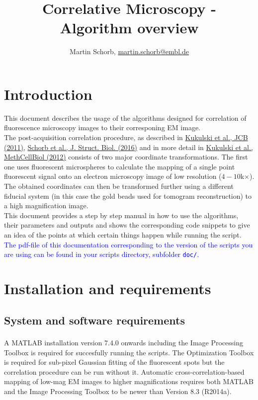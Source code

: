 \documentclass[10pt,a4paper,onepage,DIV12]{scrartcl}
\title{Correlative Microscopy - Algorithm overview}
\author{Martin Schorb, \href{mailto:martin.schorb@embl.de}{martin.schorb@embl.de}}
\begin{document}
\maketitle
\tableofcontents
 \newpage
\section{Introduction}
This document describes the usage of the algorithms designed for correlation of fluorescence microscopy images to their corresponing EM image.\\

The post-acquisition correlation procedure, as described in \href{http://dx.doi.org/10.1083/jcb.201009037}{Kukulski et al., JCB (2011)}, \href{}{Schorb et al., J. Struct. Biol. (2016)} and in more detail in \href{http://dx.doi.org/10.1016/B978-0-12-416026-2.00013-3}{Kukulski et al., MethCellBiol (2012)} consists of two major coordinate transformations. The first one uses fluorescent microspheres to calculate the mapping of a single point fluorescent signal onto an electron microscopy image of low resolution ($4-10 $k$\times$). The obtained coordinates can then be transformed further using a different fiducial system (in this case the gold beads used for tomogram reconstruction) to a high magnification image.\\

This document provides a step by step manual in how to use the algorithms, their parameters and outputs and shows the corresponding code snippets to give an idea of the points at which certain things happen while running the script.\\

\textcolor{blue}{The pdf-file of this documentation corresponding to the version of the scripts you are using can be found in your scripts directory, subfolder \texttt{doc/}.}
\section{Installation and requirements}

\subsection{System and software requirements}A MATLAB\textsuperscript{\textregistered} 
installation version 7.4.0 onwards including the Image Processing Toolbox is required for succesfully running the scripts. The Optimization Toolbox is required for sub-pixel Gaussian fitting of the fluorescent spots but the correlation procedure can be run without it. Automatic cross-correlation-based mapping of low-mag EM images to higher magnifications requires both MATLAB and the Image Processing Toolbox to be newer than Version 8.3 (R2014a).
\end{document}
